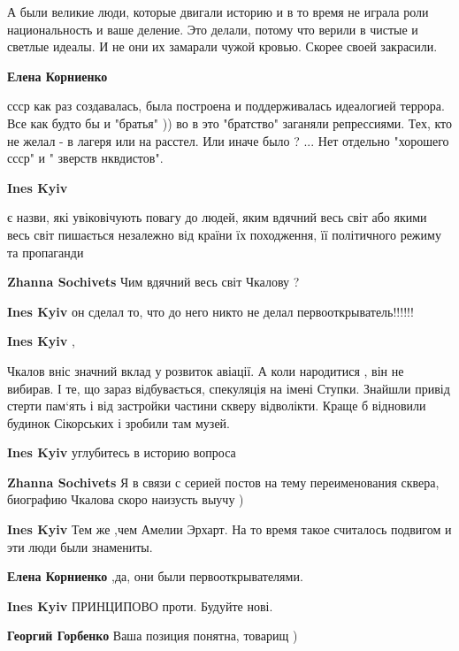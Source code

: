 \begin{itemize}
\begin{itemize}
\begin{itemize}
А были великие люди, которые двигали историю и в то время не играла роли
национальность и ваше деление. Это делали, потому что верили в чистые и светлые
идеалы. И не они их замарали чужой кровью. Скорее своей закрасили.

\textbf{Елена Корниенко} 

ссср как раз создавалась, была построена и поддерживалась идеалогией террора.
Все как будто бы и "братья" )) во в это "братство" заганяли репрессиями. Тех,
кто не желал - в лагеря или на расстел. Или иначе было ? ... Нет отдельно
"хорошего ссср" и " зверств нквдистов".

\end{itemize} %

\textbf{Ines Kyiv} 

є назви, які увіковічують повагу до людей, яким вдячний весь світ або якими
весь світ пишається незалежно від країни їх походження, її політичного режиму
та пропаганди

\begin{itemize} %
\textbf{Zhanna Sochivets} Чим вдячний весь світ Чкалову ?

\textbf{Ines Kyiv} он сделал то, что до него никто не делал первооткрыватель!!!!!!

\textbf{Ines Kyiv} , 

Чкалов вніс значний вклад у розвиток авіації. А коли народитися , він не
вибирав. І те, що зараз відбувається, спекуляція на імені Ступки. Знайшли
привід стерти пам‘ять і від застройки частини скверу відволікти. Краще б
відновили будинок Сікорських і зробили там музей.

\textbf{Ines Kyiv} углубитесь в историю вопроса

\textbf{Zhanna Sochivets} Я в связи с серией постов на тему переименования сквера, биографию Чкалова скоро наизусть выучу )

\textbf{Ines Kyiv} Тем же ,чем Амелии Эрхарт.
На то время такое считалось подвигом и эти люди были знамениты.

\textbf{Елена Корниенко} ,да, они были первооткрывателями.
\end{itemize} %

\textbf{Ines Kyiv} ПРИНЦИПОВО проти. Будуйте нові.

\begin{itemize} %
\textbf{Георгий Горбенко} Ваша позиция понятна, товарищ )


\end{itemize}
\end{itemize}
\end{itemize}

